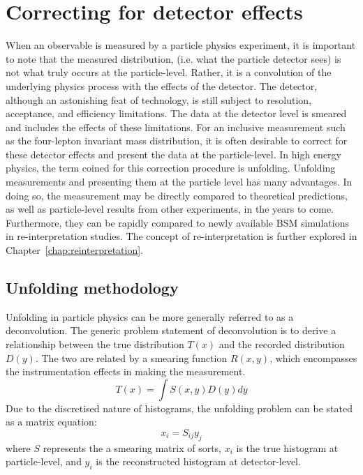 \section{Correcting for detector effects}
\label{sec:unfolding}

When an observable is measured by a particle physics experiment, it is important to note that the measured distribution, (i.e. what the particle detector sees) is not what truly occurs at the particle-level. Rather, it is a convolution of the underlying physics process with the effects of the detector. The \ATLAS detector, although an astonishing feat of technology, is still subject to resolution, acceptance, and efficiency limitations. The data at the detector level is smeared and includes the effects of these limitations. For an inclusive measurement such as the four-lepton invariant mass distribution, it is often desirable to correct for these detector effects and present the data at the particle-level. In high energy physics, the term coined for this correction procedure is unfolding. Unfolding measurements and presenting them at the particle level has many advantages. In doing so, the measurement may be directly compared to theoretical predictions, as well as particle-level results from other experiments, in the years to come. Furthermore, they can be rapidly compared to newly available BSM simulations in re-interpretation studies. The concept of re-interpretation is further explored in Chapter~\ref{chap:reinterpretation}. 

\subsection{Unfolding methodology}
\label{subsec:unfmethod}

Unfolding in particle physics can be more generally referred to as a deconvolution. The generic problem statement of deconvolution is to derive a relationship between the true distribution $T(x)$ and the recorded distribution $D(y)$. The two are related by a smearing function $R(x,y)$, which encompasses the instrumentation effects in making the measurement. 
\begin{equation} \label{eq:unfintegral}
    T(x)=\int S(x,y)D(y)dy
\end{equation}
Due to the discretised nature of histograms, the unfolding problem can be stated as a matrix equation:
\begin{equation} \label{eq:unfmatrix}
    x_i=S_{ij}y_j
\end{equation}
where $S$ represents the a smearing matrix of sorts, $x_i$ is the true histogram at particle-level, and $y_i$ is the reconstructed histogram at detector-level. 

